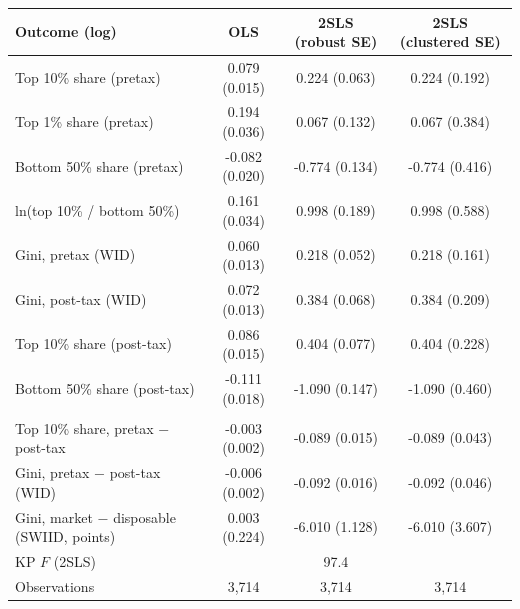 \begin{tabular}{lccc}
\toprule
Outcome (log) & OLS & 2SLS (robust SE) & 2SLS (clustered SE) \\
\midrule
Top 10\% share (pretax) & 0.079\sym{***} (0.015) & 0.224\sym{***} (0.063) & 0.224 (0.192) \\
Top 1\% share (pretax) & 0.194\sym{***} (0.036) & 0.067 (0.132) & 0.067 (0.384) \\
Bottom 50\% share (pretax) & -0.082\sym{***} (0.020) & -0.774\sym{***} (0.134) & -0.774\sym{*} (0.416) \\
ln(top 10\% / bottom 50\%) & 0.161\sym{***} (0.034) & 0.998\sym{***} (0.189) & 0.998\sym{*} (0.588) \\
Gini, pretax (WID) & 0.060\sym{***} (0.013) & 0.218\sym{***} (0.052) & 0.218 (0.161) \\
Gini, post-tax (WID) & 0.072\sym{***} (0.013) & 0.384\sym{***} (0.068) & 0.384\sym{*} (0.209) \\
Top 10\% share (post-tax) & 0.086\sym{***} (0.015) & 0.404\sym{***} (0.077) & 0.404\sym{*} (0.228) \\
Bottom 50\% share (post-tax) & -0.111\sym{***} (0.018) & -1.090\sym{***} (0.147) & -1.090\sym{**} (0.460) \\
\addlinespace\multicolumn{4}{l}{\emph{Redistribution wedge (levels)}}\\
Top 10\% share, pretax $-$ post-tax & -0.003 (0.002) & -0.089\sym{***} (0.015) & -0.089\sym{**} (0.043) \\
Gini, pretax $-$ post-tax (WID) & -0.006\sym{**} (0.002) & -0.092\sym{***} (0.016) & -0.092\sym{**} (0.046) \\
Gini, market $-$ disposable (SWIID, points) & 0.003 (0.224) & -6.010\sym{***} (1.128) & -6.010\sym{*} (3.607) \\
\midrule
KP $F$ (2SLS) & & 97.4 & \\
Observations & 3,714 & 3,714 & 3,714 \\
\bottomrule
\end{tabular}